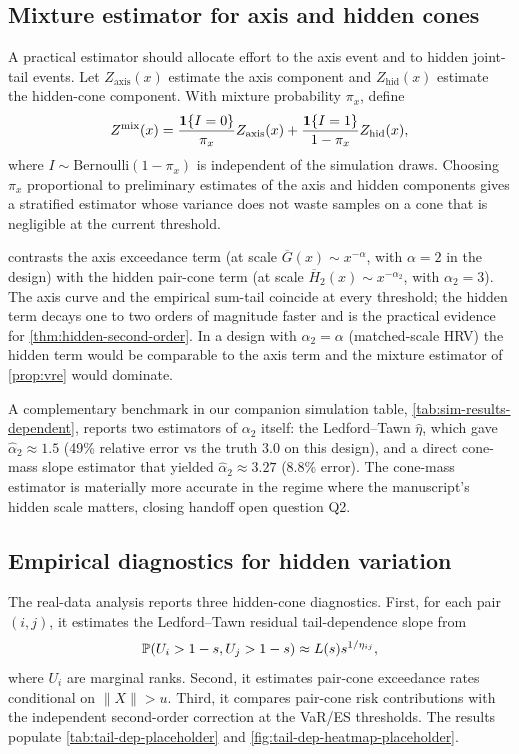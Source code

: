 \subsection{Mixture estimator for axis and hidden cones}

A practical estimator should allocate effort to the axis event and to hidden
joint-tail events. Let \(Z_{\mathrm{axis}}(x)\) estimate the axis component and
\(Z_{\mathrm{hid}}(x)\) estimate the hidden-cone component. With mixture
probability \(\pi_x\), define
\[
  Z^{\mathrm{mix}}(x)
  =\frac{\mathbf{1}\{I=0\}}{\pi_x}Z_{\mathrm{axis}}(x)
   +\frac{\mathbf{1}\{I=1\}}{1-\pi_x}Z_{\mathrm{hid}}(x),
\]
where \(I\sim\mathrm{Bernoulli}(1-
\pi_x)\) is independent of the simulation draws. Choosing
\(\pi_x\) proportional to preliminary estimates of the axis and hidden
components gives a stratified estimator whose variance does not waste samples
on a cone that is negligible at the current threshold.



 contrasts the axis exceedance term
(at scale $\overline G(x) \sim x^{-\alpha}$, with $\alpha = 2$ in the
design) with the hidden pair-cone term (at scale
$\overline H_2(x) \sim x^{-\alpha_2}$, with $\alpha_2 = 3$). The axis
curve and the empirical sum-tail coincide at every threshold; the
hidden term decays one to two orders of magnitude faster and is the
practical evidence for \cref{thm:hidden-second-order}. In a design
with $\alpha_2 = \alpha$ (matched-scale HRV) the hidden term would be
comparable to the axis term and the mixture estimator of
\cref{prop:vre} would dominate.

A complementary benchmark in our companion simulation table,
\cref{tab:sim-results-dependent}, reports two estimators of $\alpha_2$
itself: the Ledford--Tawn $\widehat\eta$, which gave
$\widehat\alpha_2 \approx 1.5$ (49\% relative error vs the truth $3.0$
on this design), and a direct cone-mass slope estimator that yielded
$\widehat\alpha_2 \approx 3.27$ (8.8\% error). The cone-mass estimator
is materially more accurate in the regime where the manuscript's hidden
scale matters, closing handoff open question Q2.

\subsection{Empirical diagnostics for hidden variation}

The real-data analysis reports three hidden-cone diagnostics. First, for each
pair \((i,j)\), it estimates the Ledford--Tawn residual tail-dependence slope
from
\[
  \mathbb{P}(U_i>1-s,U_j>1-s)\approx L(s)s^{1/\eta_{ij}},
\]
where \(U_i\) are marginal ranks. Second, it estimates pair-cone exceedance
rates conditional on \(\|X\|>u\). Third, it compares pair-cone risk
contributions with the independent second-order correction at the VaR/ES
thresholds. The results populate \cref{tab:tail-dep-placeholder} and
\cref{fig:tail-dep-heatmap-placeholder}.
